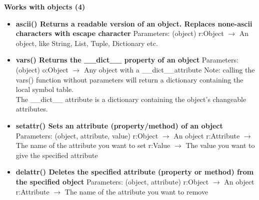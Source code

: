 \documentclass{report}
\begin{document}
      \begin{center}
        \textbf{Works with objects (4)}
      \end{center}
      \begin{itemize}
        \item[\ding{43}] \textbf{ascii()	Returns a readable version of an object. Replaces none-ascii characters with escape character}
          \smallbreak \noindent
          Parameters: (object)
          \smallbreak \noindent
          r:Object $\rightarrow$ An object, like String, List, Tuple, Dictionary etc.
          \smallbreak \noindent
        \item[\ding{43}] \textbf{vars()	Returns the \_\_dict\_\_ property of an object}
          \smallbreak \noindent
          Parameters: (object)
          \smallbreak \noindent
          o:Object $\rightarrow$ Any object with a \_\_dict\_\_attribute
          \smallbreak \noindent
          Note: calling the vars() function without parameters will return a dictionary containing the local symbol table. \\
          The \_\_dict\_\_ attribute is a dictionary containing the object's changeable attributes. 
          \smallbreak \noindent
        \item[\ding{43}] \textbf{setattr()	Sets an attribute (property/method) of an object}
          \smallbreak \noindent
          Parameters: (object, attribute, value)
          \smallbreak \noindent
          r:Object $\rightarrow$ An object
          \smallbreak \noindent
          r:Attribute $\rightarrow$ The name of the attribute you want to set
          \smallbreak \noindent
          r:Value $\rightarrow$ The value you want to give the specified attribute
          \smallbreak \noindent
        \item[\ding{43}] \textbf{delattr()	Deletes the specified attribute (property or method) from the specified object}
          \smallbreak \noindent
          Parameters: (object, attribute)
          \smallbreak \noindent
          r:Object $\rightarrow$ An object 
          \smallbreak \noindent
          r:Attribute $\rightarrow$ The name of the attribute you want to remove
          \smallbreak \noindent
      \end{itemize}
    

    \bigbreak \noindent 
    
\end{document}
